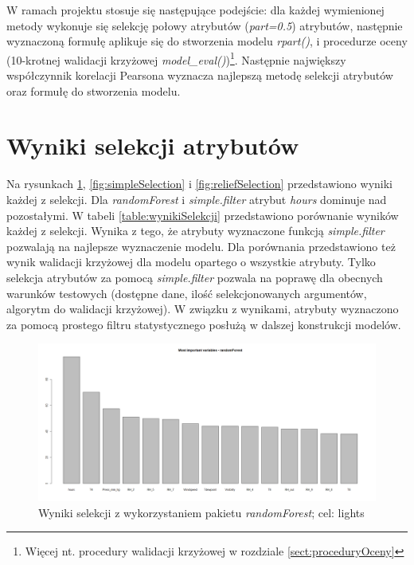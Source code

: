 \documentclass[a4paper,11pt,twoside]{mwrep}  %
\begin{document}
\par
W ramach projektu stosuje się następujące podejście: dla każdej wymienionej metody wykonuje się selekcję połowy atrybutów (\textit{part=0.5}) atrybutów, następnie wyznaczoną formułę aplikuje się do stworzenia modelu \textit{rpart()}, i procedurze oceny (10-krotnej walidacji krzyżowej \textit{model\_eval()})\footnote{Więcej nt. procedury walidacji krzyżowej w rozdziale \ref{sect:proceduryOceny}}. Następnie największy współczynnik korelacji Pearsona wyznacza najlepszą metodę selekcji atrybutów oraz formułę do stworzenia modelu.


\section{Wyniki selekcji atrybutów}

Na rysunkach \ref{fig:rfSelection}, \ref{fig:simpleSelection} i \ref{fig:reliefSelection} przedstawiono wyniki każdej z selekcji. Dla \textit{randomForest} i \textit{simple.filter} atrybut \textit{hours} dominuje nad pozostałymi. W tabeli \ref{table:wynikiSelekcji} przedstawiono porównanie wyników każdej z selekcji. Wynika z tego, że atrybuty wyznaczone funkcją \textit{simple.filter} pozwalają na najlepsze wyznaczenie modelu. Dla porównania przedstawiono też wynik walidacji krzyżowej dla modelu opartego o wszystkie atrybuty. Tylko selekcja atrybutów za pomocą \textit{simple.filter} pozwala na poprawę dla obecnych warunków testowych (dostępne dane, ilość selekcjonowanych argumentów, algorytm do walidacji krzyżowej). W związku z wynikami, atrybuty wyznaczono za pomocą prostego filtru statystycznego posłużą w dalszej konstrukcji modelów.
 \begin{figure}[!h]
    \centering \includegraphics[scale=0.3]{../rfSelection_lights.png}
    \caption{Wyniki selekcji z wykorzystaniem pakietu \textit{randomForest}; cel: lights}
    \label{fig:rfSelection}
\end{figure}
\end{document}
